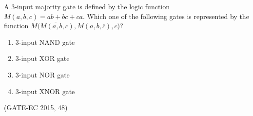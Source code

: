 \item A 3-input majority gate is defined by the logic function \(M(a, b, c) = ab + bc + ca\). Which one of the following gates is represented by the function \(M\overline{(M(a, b, c)}, M(a, b, \overline{c}), c)\)?
\begin{enumerate}

    \item 3-input NAND gate 
    \item 3-input XOR gate 
    \item 3-input NOR gate 
    \item 3-input XNOR gate 
    
\end{enumerate}
    \hfill(GATE-EC 2015, 48)
